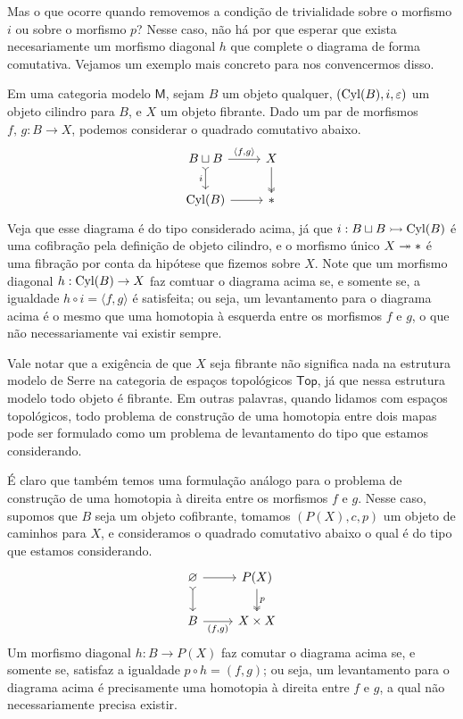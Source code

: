 Mas o que ocorre quando removemos a condição de trivialidade sobre o morfismo $i$ ou sobre o morfismo $p$?
Nesse caso, não há por que esperar que exista necesariamente um morfismo diagonal $h$ que complete o diagrama de forma comutativa.
Vejamos um exemplo mais concreto para nos convencermos disso.

\begin{exem}
  \label{exem:homotopia_como_levantamento}
  Em uma categoria modelo $\mathsf{M}$, sejam $B$ um objeto qualquer, $(\mathrm{Cyl}(B),i,\varepsilon)$ um objeto cilindro para $B$, e $X$ um objeto fibrante.
  Dado um par de morfismos $f,\,g: B \to X$, podemos considerar o quadrado comutativo abaixo.
  \begin{displaymath}
    \begin{tikzcd}
      B \sqcup B
      \arrow[r, "{\langle f,g \rangle}"]
      \arrow[d, tail, "i" swap]
      & X
      \arrow[d, two heads]
      \\ \Cyl(B)
      \arrow[r]
      & *
    \end{tikzcd}
  \end{displaymath}
  Veja que esse diagrama é do tipo considerado acima, já que $i: B \sqcup B \rightarrowtail \mathrm{Cyl}(B)$ é uma cofibração pela definição de objeto cilindro, e o morfismo único $X \twoheadrightarrow *$ é uma fibração por conta da hipótese que fizemos sobre $X$.
  Note que um morfismo diagonal $h: \mathrm{Cyl}(B) \to X$ faz comtuar o diagrama acima se, e somente se, a igualdade $h \circ i = \langle f,g \rangle$ é satisfeita; ou seja, um levantamento para o diagrama acima é o mesmo que uma homotopia à esquerda entre os morfismos $f$ e $g$, o que não necessariamente vai existir sempre.

  Vale notar que a exigência de que $X$ seja fibrante não significa nada na estrutura modelo de Serre na categoria de espaços topológicos $\mathsf{Top}$, já que nessa estrutura modelo todo objeto é fibrante.
  Em outras palavras, quando lidamos com espaços topológicos, todo problema de construção de uma homotopia entre dois mapas pode ser formulado como um problema de levantamento do tipo que estamos considerando.

  É claro que também temos uma formulação análogo para o problema de construção de uma homotopia à direita entre os morfismos $f$ e $g$.
  Nesse caso, supomos que $B$ seja um objeto cofibrante, tomamos $(P(X),c,p)$ um objeto de caminhos para $X$, e consideramos o quadrado comutativo abaixo o qual é do tipo que estamos considerando.
  \begin{displaymath}
    \begin{tikzcd}
      \varnothing
      \arrow[d, tail]
      \arrow[r]
      & P(X)
      \arrow[d, two heads, "p"]
      \\ B
      \arrow[r, "{(f,g)}" swap]
      & X \times X
    \end{tikzcd}
  \end{displaymath}
  Um morfismo diagonal $h: B \to P(X)$ faz comutar o diagrama acima se, e somente se, satisfaz a igualdade $p \circ h = (f,g)$; ou seja, um levantamento para o diagrama acima é precisamente uma homotopia à direita entre $f$ e $g$, a qual não necessariamente precisa existir.
\end{exem}

